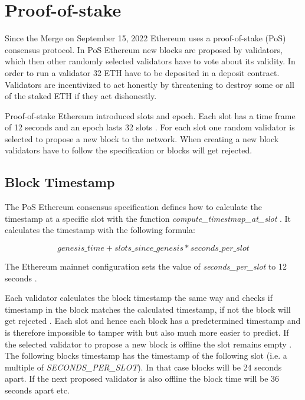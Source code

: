 \section{Proof-of-stake}

Since the Merge on September 15, 2022 Ethereum uses a proof-of-stake (PoS)
consensus protocol. In PoS Ethereum new blocks are proposed by validators,
which then other randomly selected validators have to vote about its validity. 
In order to run a validator 32 ETH have to be deposited in a deposit
contract. Validators are incentivized to act honestly by threatening to destroy
some or all of the staked ETH if they act dishonestly.

Proof-of-stake Ethereum introduced slots and epoch. Each slot has a time frame
of 12 seconds and an epoch lasts 32 slots
\cite{seconds-per-slot-mainnet}\cite{seconds-per-slot-mainnet-doc}. For each
slot one random validator is selected to propose a new block to the network.
When creating a new block validators have to follow the specification or blocks
will get rejected.

\subsection{Block Timestamp}

The PoS Ethereum consensus specification defines how to calculate the timestamp
at a specific slot with the function \textit{compute\_timestmap\_at\_slot}
\cite{compute-timestamp-at-slot}. It calculates the timestamp with the following formula:

\begin{equation}
genesis\_time + slots\_since\_genesis *
seconds\_per\_slot
\end{equation}

The Ethereum mainnet configuration sets the
value of \textit{seconds\_per\_slot} to 12 seconds
\cite{seconds-per-slot-mainnet} \cite{seconds-per-slot-mainnet-doc}.


Each validator calculates the block timestamp the same way and checks if
timestamp in the block matches the calculated timestamp, if not the block will
get rejected \cite{process-execution-payload}. Each slot and hence each block
has a predetermined timestamp and is therefore impossible to tamper with but
also much more easier to predict. If the selected validator to propose a new
block is offline the slot remains empty \cite{validator-offline}. The following
blocks timestamp has the timestamp of the following slot (i.e. a multiple of
\textit{SECONDS\_PER\_SLOT}). In that case blocks will be 24 seconds apart. If
the next proposed validator is also offline the block time will be 36 seconds
apart etc.

